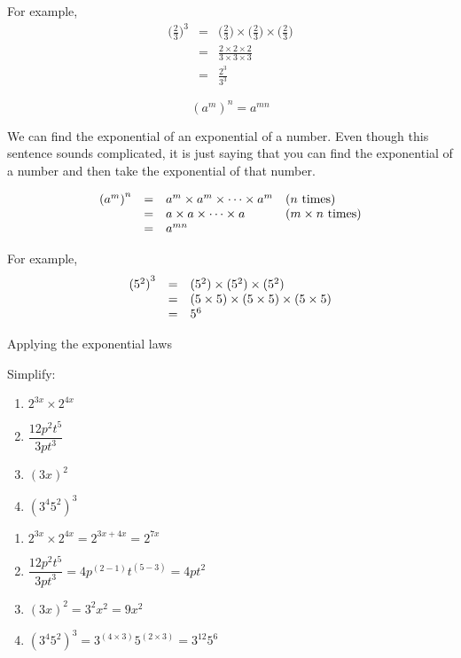 For example,
\begin{eqnarray*}
\Big(\frac{2}{3}\Big)^3 & = & \Big(\frac{2}{3}\Big) \times  \Big(\frac{2}{3}\Big) \times \Big(\frac{2}{3}\Big) \\
                        & = & \frac{2 \times 2 \times 2}{3 \times 3 \times 3} \\
		        & = & \frac{2^3}{3^3}
\end{eqnarray*}

\Identity
{
$$ {({a}^{m})}^{n}={a}^{mn} $$

We can find the exponential of an exponential of a number. Even though this sentence sounds complicated, it is just saying that you can find the exponential of a number and then take the exponential of that number. \par


\begin{equation*}
    \begin{array}{ccll}\hfill {({a}^{m})}^{n}& =& {a}^{m}  \times {a}^{m}  \times \cdots  \times {a}^{m}\hfill & (\mbox{$n$ times})\hfill \\
	\hfill & =& a  \times a  \times \cdots  \times a\hfill & ({m}  \times \mbox{$n$ times})\hfill \\
	\hfill & =& {a}^{mn}\hfill & 
    \end{array}
\end{equation*}

}
For example,
\begin{equation*}
    \begin{array}{ccl}\hfill {({5}^{2})}^{3}& =& ({5}^{2})  \times ({5}^{2})  \times ({5}^{2})\hfill \\ 
	      & =& (5  \times 5)  \times (5  \times 5)  \times (5  \times 5)\hfill \\
	      & =& 5^6\hfill
    \end{array}
\end{equation*}



\begin{wex}
{Applying the exponential laws}
{Simplify:
\begin{enumerate}[itemsep=6pt, label=\textbf{\arabic*}.]
\item $2^{3x} \times 2^{4x}$
\item $\dfrac{12p^2t^5}{3pt^3}$
\item $ (3x)^2 $
\item $(3^4 5^2)^3$
\end{enumerate}
}
{
\begin{enumerate}[itemsep=6pt, label=\textbf{\arabic*}.]
\item  $2^{3x} \times 2^{4x} = 2^{3x+4x} = 2^{7x}$
 \item $\dfrac{12p^2t^5}{3pt^3} = 4p^{(2-1)}t^{(5-3)} = 4pt^2$
 \item $ (3x)^2 = 3^2x^2 = 9x^2$
 \item $(3^4 5^2)^3 = 3^{(4\times3)} 5^{(2\times3)} = 3^{12} 5^6  $
\end{enumerate}
}
\end{wex}

